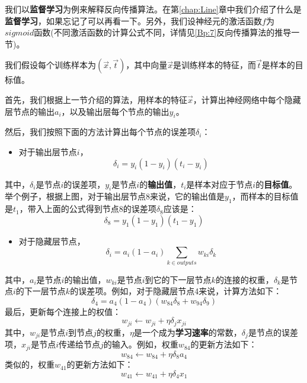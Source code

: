 我们以\textbf{监督学习}为例来解释反向传播算法。在第\ref{chap:Line}章中我们介绍了什么是\textbf{监督学习}，如果忘记了可以再看一下。另外，我们设神经元的激活函数\(f\)为\(sigmoid\)函数(不同激活函数的计算公式不同，详情见\ref{Bp:7}反向传播算法的推导一节)。

我们假设每个训练样本为\((\vec{x},\vec{t})\)，其中向量\(\vec{x}\)是训练样本的特征，而\(\vec{t}\)是样本的目标值。

首先，我们根据上一节介绍的算法，用样本的特征\(\vec{x}\)，计算出神经网络中每个隐藏层节点的输出\(a_i\)，以及输出层每个节点的输出\(y_i\)。

然后，我们按照下面的方法计算出每个节点的误差项\(\delta_i\)：

\begin{itemize}
	\item
	      对于输出层节点\(i\)，
	      \begin{equation}
		      \label{eq:Bp3}
		      \delta_i=y_i(1-y_i)(t_i-y_i)
	      \end{equation}

\end{itemize}
其中，\(\delta_i\)是节点\(i\)的误差项，\(y_i\)是节点\(i\)的\textbf{输出值}，\(t_i\)是样本对应于节点\(i\)的\textbf{目标值}。举个例子，根据上图，对于输出层节点8来说，它的输出值是\(y_1\)，而样本的目标值是\(t_1\)，带入上面的公式得到节点8的误差项\(\delta_8\)应该是：
\[
	\delta_8=y_1(1-y_1)(t_1-y_1)
\]

\begin{itemize}
	\item
	      对于隐藏层节点，
	      \begin{equation}
		      \label{eq:Bp4}
		      \delta_i=a_i(1-a_i)\sum_{k\in{outputs}}w_{ki}\delta_k
	      \end{equation}
\end{itemize}
其中，\(a_i\)是节点\(i\)的输出值，\(w_{ki}\)是节点\(i\)到它的下一层节点\(k\)的连接的权重，\(\delta_k\)是节点\(i\)的下一层节点\(k\)的误差项。例如，对于隐藏层节点4来说，计算方法如下：
\[
	\delta_4=a_4(1-a_4)(w_{84}\delta_8+w_{94}\delta_9)
\]
最后，更新每个连接上的权值：
\begin{equation}
	\label{eq:Bp5}
	w_{ji}\gets w_{ji}+\eta\delta_jx_{ji}
\end{equation}
其中，\(w_{ji}\)是节点\(i\)到节点\(j\)的权重，\(\eta\)是一个成为\textbf{学习速率}的常数，\(\delta_j\)是节点的误差项，\(x_{ji}\)是节点\(i\)传递给节点\(j\)的输入。例如，权重\(w_84\)的更新方法如下：
\[
	w_{84}\gets w_{84}+\eta\delta_8 a_4
\]
类似的，权重\(w_{41}\)的更新方法如下：
\[
	w_{41}\gets w_{41}+\eta\delta_4 x_1
\]

